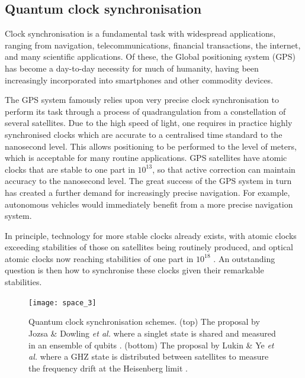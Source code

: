 %
%

\subsection{Quantum clock synchronisation} \label{sec:clock_sync}


Clock synchronisation is a fundamental task with widespread applications, ranging from navigation, telecommunications, financial transactions, the internet, and many scientific applications. Of these, the Global positioning system (GPS) has become a day-to-day necessity for much of humanity, having been increasingly incorporated into smartphones and other commodity devices.

The GPS system famously relies upon very precise clock synchronisation to perform its task through a process of quadrangulation from a constellation of several satellites. Due to the high speed of light, one requires in practice highly synchronised clocks which are accurate to a centralised time standard to the nanosecond level. This allows positioning to be performed to the level of meters, which is acceptable for many routine applications. GPS satellites have atomic clocks that are stable to one part in $10^{13}$, so that active correction can maintain accuracy to the nanosecond level. The great success of the GPS system in turn has created a further demand for increasingly precise navigation. For example, autonomous vehicles would immediately benefit from a more precise navigation system.

In principle, technology for more stable clocks already exists, with atomic clocks exceeding stabilities of those on satellites being routinely produced, and optical atomic clocks now reaching stabilities of one part in $10^{18}$ \cite{bib:ludlow2015optical}. An outstanding question is then how to synchronise these clocks given their remarkable stabilities. 

\begin{figure}[htpb]
\texttt{[image: space\_3]}
\caption{Quantum clock synchronisation schemes. (top) The proposal by Jozsa \& Dowling \textit{et al.} where a singlet state is shared and measured in an ensemble of qubits \cite{bib:jozsa00}. (bottom) The proposal by Lukin \& Ye \textit{et al.} where a GHZ state is distributed between satellites to measure the frequency drift at the Heisenberg limit \cite{bib:komar14}.}
\label{fig:space_3}
\end{figure}

